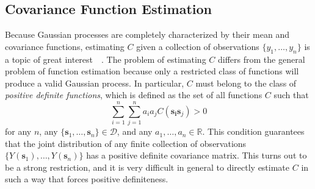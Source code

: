 \documentclass[12pt]{article}
\begin{document}


\subsection{Covariance Function Estimation} %
\label{sec:covariance_function_estimation}

Because Gaussian processes are completely characterized by their mean and covariance functions, estimating $C$ given a collection of observations $\{y_1, \dots, y_n\}$ is a topic of great interest~\cite{ver1993multivariable}~\cite{banerjee2014hierarchical}. The problem of estimating $C$ differs from the general problem of function estimation because only a restricted class of functions will produce a valid Gaussian process. In particular, $C$ must belong to the class of \emph{positive definite functions}, which is defined as the set of all functions $C$ such that
\[
  \sum_{i=1}^n \sum_{j=1}^n a_i a_j C(\bm{s_i}\bm{s}_j) > 0
\]
for any $n$, any $\{\bm{s}_1, \dots, \bm{s}_n\} \in \mathcal{D}$, and any $a_1, \ldots, a_n \in \mathbb{R}$. This condition guarantees that the joint distribution of any finite collection of observations $\{Y(\bm{s}_1), \ldots, Y(\bm{s}_n)\}$ has a positive definite covariance matrix. This turns out to be a strong restriction, and it is very difficult in general to directly estimate $C$ in such a way that forces positive definiteness.
\end{document}
